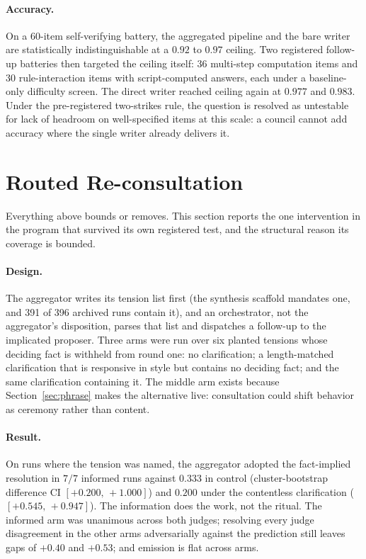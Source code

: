 \documentclass[11pt]{article}
\newcommand{\ci}[2]{\ensuremath{[#1,\,#2]}}
\begin{document}
\paragraph{Accuracy.} On a 60-item self-verifying battery, the
aggregated pipeline and the bare writer are statistically
indistinguishable at a $0.92$ to $0.97$ ceiling. Two registered
follow-up batteries then targeted the ceiling itself: 36 multi-step
computation items and 30 rule-interaction items with script-computed
answers, each under a baseline-only difficulty screen. The direct
writer reached ceiling again at $0.977$ and $0.983$. Under the
pre-registered two-strikes rule, the question is resolved as untestable
for lack of headroom on well-specified items at this scale: a council
cannot add accuracy where the single writer already delivers it.

\section{Routed Re-consultation}
\label{sec:reconsult}

Everything above bounds or removes. This section reports the one
intervention in the program that survived its own registered test, and
the structural reason its coverage is bounded.

\paragraph{Design.} The aggregator writes its tension list first (the
synthesis scaffold mandates one, and 391 of 396 archived runs contain
it), and an orchestrator, not the aggregator's disposition, parses that
list and dispatches a follow-up to the implicated proposer. Three arms
were run over six planted tensions whose deciding fact is withheld from
round one: no clarification; a length-matched clarification that is
responsive in style but contains no deciding fact; and the same
clarification containing it. The middle arm exists because
Section~\ref{sec:phrase} makes the alternative live: consultation could
shift behavior as ceremony rather than content.

\paragraph{Result.} On runs where the tension was named, the aggregator
adopted the fact-implied resolution in $7/7$ informed runs against
$0.333$ in control (cluster-bootstrap difference CI \ci{+0.200}{+1.000})
and $0.200$ under the contentless clarification (\ci{+0.545}{+0.947}).
The information does the work, not the ritual. The informed arm was
unanimous across both judges; resolving every judge disagreement in the
other arms adversarially against the prediction still leaves gaps of
$+0.40$ and $+0.53$; and emission is flat across arms.
\end{document}
